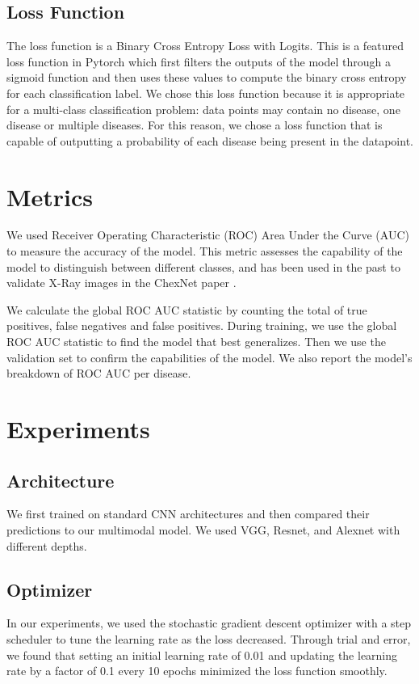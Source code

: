 \documentclass[10pt,letterpaper]{article}
\begin{document}
\subsection{Loss Function}
The loss function is a Binary Cross Entropy Loss with Logits. This is a featured loss function in Pytorch which first filters the outputs of the model through a sigmoid function and then uses these values to compute the binary cross entropy for each classification label. We chose this loss function because it is appropriate for a multi-class classification problem: data points may contain no disease, one disease or multiple diseases. For this reason, we chose a loss function that is capable of outputting a probability of each disease being present in the datapoint.

\section{Metrics}
We used Receiver Operating Characteristic (ROC) Area Under the Curve (AUC) to measure the accuracy of the model. This metric assesses the capability of the model to distinguish between different classes, and has been used in the past to validate X-Ray images in the ChexNet paper \cite{1711.05225}. 

We calculate the global ROC AUC statistic by counting the total of true positives, false negatives and false positives. During training, we use the global ROC AUC statistic to find the model that best generalizes. Then we use the validation set to confirm the capabilities of the model. We also report the model's breakdown of ROC AUC per disease.

\section{Experiments}

\subsection{Architecture}
We first trained on standard CNN architectures and then compared their predictions to our multimodal model. We used VGG, Resnet, and Alexnet with different depths.

\subsection{Optimizer}
In our experiments, we used the stochastic gradient descent optimizer with a step scheduler to tune the learning rate as the loss decreased. Through trial and error, we found that setting an initial learning rate of 0.01 and updating the learning rate by a factor of 0.1 every 10 epochs minimized the loss function smoothly.
\end{document}
